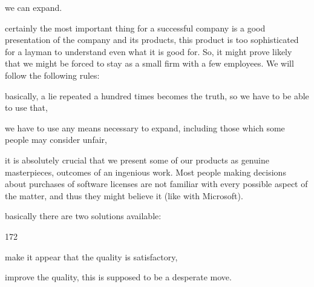 \documentclass[a4paper,twoside,15pt]{book}
\begin{document}
\begin{description}
\begin{dinglist}{75}
                        \item we can expand.
                    \end{dinglist}
                \item[The project might be too sophisticated:]
                    certainly the most important thing for a successful company is a good presentation of the company and its products, this product is too sophisticated for a layman to understand even what it is good for. So, it might prove likely that we might be forced to stay as a small firm with a few employees. We will follow the following rules:
                    \begin{dinglist}{75}
                        \item basically, a lie repeated a hundred times becomes the truth, so we have to be able to use that,
                        \item we have to use any means necessary to expand, including those which some people may consider unfair,
                        \item it is absolutely crucial that we present some of our products as genuine masterpieces, outcomes of an ingenious work. Most people making decisions about purchases of software licenses are not familiar with every possible aspect of the matter, and thus they might believe it (like with Microsoft).
                    \end{dinglist}
                \item[We might not be able to deliver the final product with satisfactory quality:] basically there are two solutions available:
                    \begin{dingautolist}{172}
                        \item make it appear that the quality is satisfactory,
                        \item improve the quality, this is supposed to be a desperate move.
                    \end{dingautolist}
             \end{description}
\end{document}
